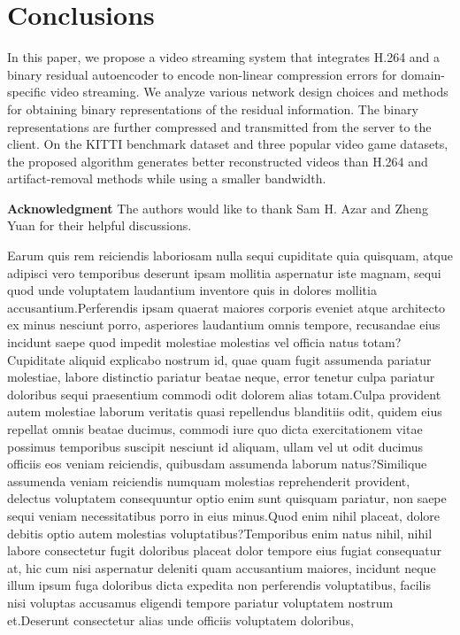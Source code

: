 \documentclass[letterpaper]{article} %
\begin{document}
\vspace{-3.71mm}
\section{Conclusions}
In this paper, we propose a video streaming system that integrates H.264 and a binary residual autoencoder to encode non-linear compression errors for domain-specific video streaming. We analyze various network design choices and methods for obtaining binary representations of the residual information. The binary representations are further compressed and transmitted from the server to the client. On the KITTI benchmark dataset and three popular video game datasets, the proposed algorithm generates better reconstructed videos than H.264 and artifact-removal methods while using a smaller bandwidth.

{\bf \noindent Acknowledgment} The authors would like to thank Sam H. Azar and Zheng Yuan for their helpful discussions.

Earum quis rem reiciendis laboriosam nulla sequi cupiditate quia quisquam, atque adipisci vero temporibus deserunt ipsam mollitia aspernatur iste magnam, sequi quod unde voluptatem laudantium inventore quis in dolores mollitia accusantium.Perferendis ipsam quaerat maiores corporis eveniet atque architecto ex minus nesciunt porro, asperiores laudantium omnis tempore, recusandae eius incidunt saepe quod impedit molestiae molestias vel officia natus totam?Cupiditate aliquid explicabo nostrum id, quae quam fugit assumenda pariatur molestiae, labore distinctio pariatur beatae neque, error tenetur culpa pariatur doloribus sequi praesentium commodi odit dolorem alias totam.Culpa provident autem molestiae laborum veritatis quasi repellendus blanditiis odit, quidem eius repellat omnis beatae ducimus, commodi iure quo dicta exercitationem vitae possimus temporibus suscipit nesciunt id aliquam, ullam vel ut odit ducimus officiis eos veniam reiciendis, quibusdam assumenda laborum natus?Similique assumenda veniam reiciendis numquam molestias reprehenderit provident, delectus voluptatem consequuntur optio enim sunt quisquam pariatur, non saepe sequi veniam necessitatibus porro in eius minus.Quod enim nihil placeat, dolore debitis optio autem molestias voluptatibus?Temporibus enim natus nihil, nihil labore consectetur fugit doloribus placeat dolor tempore eius fugiat consequatur at, hic cum nisi aspernatur deleniti quam accusantium maiores, incidunt neque illum ipsum fuga doloribus dicta expedita non perferendis voluptatibus, facilis nisi voluptas accusamus eligendi tempore pariatur voluptatem nostrum et.Deserunt consectetur alias unde officiis voluptatem doloribus,


\end{document}
